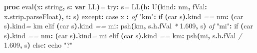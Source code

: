 \documentclass[
  12pt,
]{book}
\newenvironment{Shaded}{}{}
\newcommand{\CommentTok}[1]{\textcolor[rgb]{0.38,0.63,0.69}{\textit{#1}}}
\newcommand{\DataTypeTok}[1]{\textcolor[rgb]{0.56,0.13,0.00}{#1}}
\newcommand{\DecValTok}[1]{\textcolor[rgb]{0.25,0.63,0.44}{#1}}
\newcommand{\FloatTok}[1]{\textcolor[rgb]{0.25,0.63,0.44}{#1}}
\newcommand{\KeywordTok}[1]{\textcolor[rgb]{0.00,0.44,0.13}{\textbf{#1}}}
\newcommand{\NormalTok}[1]{#1}
\newcommand{\StringTok}[1]{\textcolor[rgb]{0.25,0.44,0.63}{#1}}
\begin{document}
\begin{Shaded}
\begin{Highlighting}[]
\KeywordTok{proc }\StringTok{eval}\KeywordTok{(}\NormalTok{x}\KeywordTok{:} \DataTypeTok{string}\KeywordTok{,}\NormalTok{ s}\KeywordTok{:} \KeywordTok{var} \DataTypeTok{LL}\KeywordTok{)}\CommentTok{=}
  \DataTypeTok{try}\KeywordTok{:}\NormalTok{ s}\CommentTok{=} \DataTypeTok{LL}\KeywordTok{(}\NormalTok{h}\KeywordTok{:} \DataTypeTok{U}\KeywordTok{(}\NormalTok{kind}\KeywordTok{:}\NormalTok{ nm}\KeywordTok{,}\NormalTok{ fVal}\KeywordTok{:}\NormalTok{ x}\KeywordTok{.}\DataTypeTok{strip}\KeywordTok{.}\DataTypeTok{parseFloat}\KeywordTok{),}\NormalTok{ t}\KeywordTok{:}\NormalTok{ s}\KeywordTok{)}
  \DataTypeTok{except}\KeywordTok{:}
    \DataTypeTok{case} \DataTypeTok{x} \KeywordTok{:}
      \CommentTok{of} \StringTok{"km"}\KeywordTok{:}
         \DataTypeTok{if} \KeywordTok{(}\DataTypeTok{car}\NormalTok{ s}\KeywordTok{).}\DataTypeTok{kind} \CommentTok{==}\NormalTok{ nm}\KeywordTok{:} \KeywordTok{(}\DataTypeTok{car}\NormalTok{ s}\KeywordTok{).}\DataTypeTok{kind}\CommentTok{=}\NormalTok{ km}
         \DataTypeTok{elif} \KeywordTok{(}\DataTypeTok{car}\NormalTok{ s}\KeywordTok{).}\DataTypeTok{kind} \CommentTok{==}\NormalTok{ mi}\KeywordTok{:} \DataTypeTok{psh}\KeywordTok{(}\NormalTok{km}\KeywordTok{,}\NormalTok{ s}\KeywordTok{.}\DataTypeTok{h}\KeywordTok{.}\DataTypeTok{fVal} \CommentTok{*} \DecValTok{1}\FloatTok{.}\DecValTok{609}\KeywordTok{,}\NormalTok{ s}\KeywordTok{)}
      \CommentTok{of} \StringTok{"mi"}\KeywordTok{:}
        \DataTypeTok{if} \KeywordTok{(}\DataTypeTok{car}\NormalTok{ s}\KeywordTok{).}\DataTypeTok{kind} \CommentTok{==}\NormalTok{ nm}\KeywordTok{:} \KeywordTok{(}\DataTypeTok{car}\NormalTok{ s}\KeywordTok{).}\DataTypeTok{kind}\CommentTok{=}\NormalTok{ mi}
        \DataTypeTok{elif} \KeywordTok{(}\DataTypeTok{car}\NormalTok{ s}\KeywordTok{).}\DataTypeTok{kind} \CommentTok{==}\NormalTok{ km}\KeywordTok{:} \DataTypeTok{psh}\KeywordTok{(}\NormalTok{mi}\KeywordTok{,}\NormalTok{ s}\KeywordTok{.}\DataTypeTok{h}\KeywordTok{.}\DataTypeTok{fVal} \CommentTok{/} \DecValTok{1}\FloatTok{.}\DecValTok{609}\KeywordTok{,}\NormalTok{ s}\KeywordTok{)}
      \DataTypeTok{else}\KeywordTok{:} \DataTypeTok{echo} \StringTok{"?"}


\end{Highlighting}
\end{Shaded}
\end{document}
